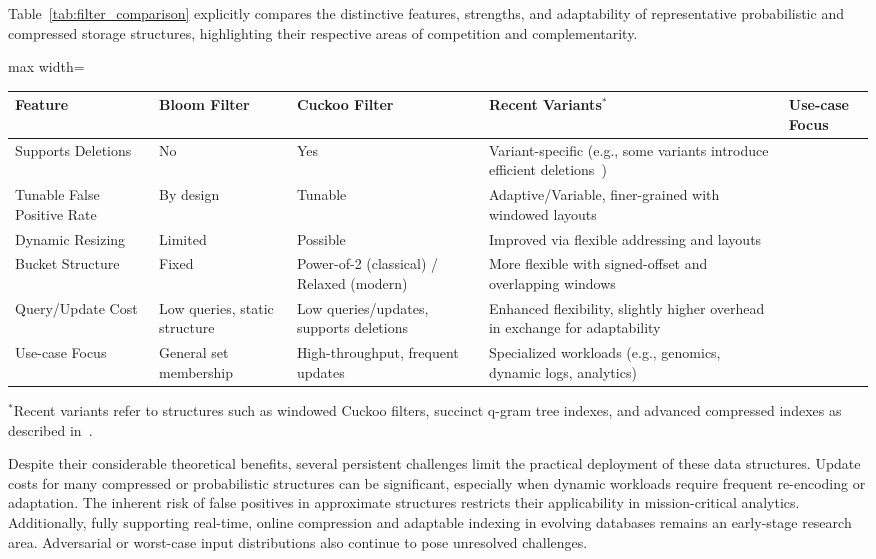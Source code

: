\documentclass[sigconf]{acmart}
\begin{document}
Table~\ref{tab:filter_comparison} explicitly compares the distinctive features, strengths, and adaptability of representative probabilistic and compressed storage structures, highlighting their respective areas of competition and complementarity.

\begin{table*}[htbp]
\centering
\caption{Comparison of Key Features among Probabilistic and Compressed Storage Structures}
\label{tab:filter_comparison}
\begin{adjustbox}{max width=\textwidth}
\begin{tabular}{@{}lllll@{}}
\toprule
Feature & Bloom Filter & Cuckoo Filter & Recent Variants$^*$ & Use-case Focus \\
\midrule
Supports Deletions & No & Yes & Variant-specific (e.g., some variants introduce efficient deletions~\cite{ref87}) & \\
Tunable False Positive Rate & By design & Tunable & Adaptive/Variable, finer-grained with windowed layouts~\cite{ref87} & \\
Dynamic Resizing & Limited & Possible & Improved via flexible addressing and layouts~\cite{ref87} & \\
Bucket Structure & Fixed & Power-of-2 (classical) / Relaxed (modern) & More flexible with signed-offset and overlapping windows~\cite{ref87} & \\
Query/Update Cost & Low queries, static structure & Low queries/updates, supports deletions & Enhanced flexibility, slightly higher overhead in exchange for adaptability~\cite{ref87} & \\
Use-case Focus & General set membership & High-throughput, frequent updates & Specialized workloads (e.g., genomics, dynamic logs, analytics) & \\
\bottomrule
\end{tabular}
\end{adjustbox}
\vspace{1ex}
\footnotesize $^*$Recent variants refer to structures such as windowed Cuckoo filters, succinct q-gram tree indexes, and advanced compressed indexes as described in~\cite{ref87,ref106,ref108,ref109}.
\end{table*}

Despite their considerable theoretical benefits, several persistent challenges limit the practical deployment of these data structures. Update costs for many compressed or probabilistic structures can be significant, especially when dynamic workloads require frequent re-encoding or adaptation. The inherent risk of false positives in approximate structures restricts their applicability in mission-critical analytics. Additionally, fully supporting real-time, online compression and adaptable indexing in evolving databases remains an early-stage research area. Adversarial or worst-case input distributions also continue to pose unresolved challenges.
\end{document}
